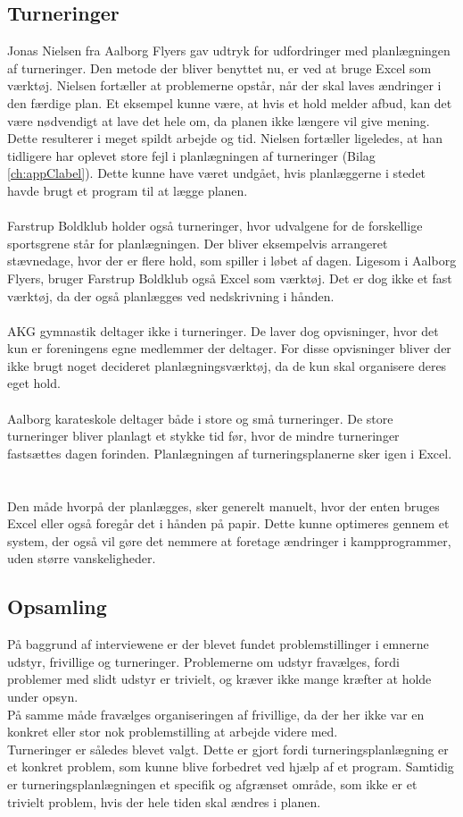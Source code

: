 \subsection*{Turneringer}
Jonas Nielsen fra Aalborg Flyers gav udtryk for udfordringer med planlægningen af turneringer. Den metode der bliver benyttet nu, er ved at bruge Excel som værktøj. Nielsen fortæller at problemerne opstår, når der skal laves ændringer i den færdige plan. Et eksempel kunne være, at hvis et hold melder afbud, kan det være nødvendigt at lave det hele om, da planen ikke længere vil give mening. Dette resulterer i meget spildt arbejde og tid. Nielsen fortæller ligeledes, at han tidligere har oplevet store fejl i planlægningen af turneringer (Bilag \ref{ch:appClabel}). Dette kunne have været undgået, hvis planlæggerne i stedet havde brugt et program til at lægge planen.
\\\\
Farstrup Boldklub holder også turneringer, hvor udvalgene for de forskellige sportsgrene står for planlægningen. Der bliver eksempelvis arrangeret stævnedage, hvor der er flere hold, som spiller i løbet af dagen. Ligesom i Aalborg Flyers, bruger Farstrup Boldklub også Excel som værktøj. Det er dog ikke et fast værktøj, da der også planlægges ved nedskrivning i hånden.
\\\\
AKG gymnastik deltager ikke i turneringer. De laver dog opvisninger, hvor det kun er foreningens egne medlemmer der deltager. For disse opvisninger bliver der ikke brugt noget decideret planlægningsværktøj, da de kun skal organisere deres eget hold. %
\\\\
Aalborg karateskole deltager både i store og små turneringer. De store turneringer bliver planlagt et stykke tid før, hvor de mindre turneringer fastsættes dagen forinden. Planlægningen af turneringsplanerne sker igen i Excel. 
\\\\\\
Den måde hvorpå der planlægges, sker generelt manuelt, hvor der enten bruges Excel eller også foregår det i hånden på papir. Dette kunne optimeres gennem et system, der også vil gøre det nemmere at foretage ændringer i kampprogrammer, uden større vanskeligheder.

\subsection*{Opsamling}
På baggrund af interviewene er der blevet fundet problemstillinger i emnerne udstyr, frivillige og turneringer. Problemerne om udstyr fravælges, fordi problemer med slidt udstyr er trivielt, og kræver ikke mange kræfter at holde under opsyn. \\
På samme måde fravælges organiseringen af frivillige, da der her ikke var en konkret eller stor nok problemstilling at arbejde videre med.\\
Turneringer er således blevet valgt. Dette er gjort fordi turneringsplanlægning er et konkret problem, som kunne blive forbedret ved hjælp af et program. Samtidig er turneringsplanlægningen et specifik og afgrænset område, som ikke er et trivielt problem, hvis der hele tiden skal ændres i planen.

